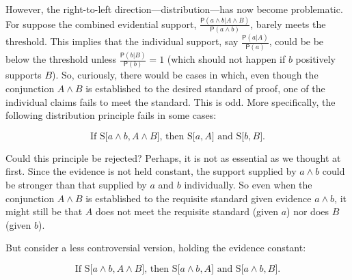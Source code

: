 \documentclass[10pt,dvipsnames,enabledeprecatedfontcommands]{scrartcl}
\newcommand{\et}{\wedge}
\newcommand{\pr}[1]{\mathsf{P}(#1)}
\begin{document}
However, the right-to-left direction---distribution---has now become
problematic. For suppose the combined evidential support,
\(\frac{\pr{a \et b | A \et B}}{\pr{a \et b}}\), barely meets the
threshold. This implies that the individual support, say
\(\frac{\pr{a |A}}{\pr{a}}\), could be be below the threshold unless
\(\frac{\pr{b |B}}{\pr{b}}=1\)
(which should not happen if \(b\) positively supports \(B\)). So,
curiously, there would be cases in which, even though the conjunction
\(A\et B\) is established to the desired standard of proof, one of the
individual claims fails to meet the standard. This is odd. More
specifically, the following distribution principle fails in some cases:

\[\text{If S[$a \wedge b, A\wedge B$], then S[$a, A$] and S[$b, B$].} \tag{DIS1}\]

\noindent Could this principle be rejected? Perhaps, it is not as
essential as we thought at first. Since the evidence is not held
constant, the support supplied by \(a\wedge b\) could be stronger than
that supplied by \(a\) and \(b\) individually. So even when the
conjunction \(A \wedge B\) is established to the requisite standard
given evidence \(a\wedge b\), it might still be that \(A\) does not meet
the requisite standard (given \(a\)) nor does \(B\) (given \(b\)).

But consider a less controversial version, holding the evidence
constant:

\[\text{If S[$a \wedge b, A\wedge B$], then S[$a \wedge b, A$] and S[$a \wedge b, B$].} \tag{DIS2}\]
\end{document}
